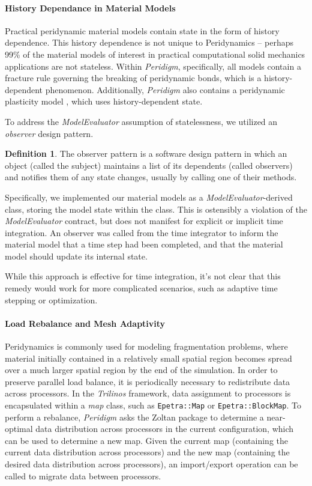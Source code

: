 \documentclass[10pt]{article}
\theoremstyle{plain}
\theoremstyle{definition}
\newtheorem{defn}{Definition}[section]
\theoremstyle{remark}
\numberwithin{equation}{section}
\begin{document}
\paragraph{History Dependance in Material Models}

Practical peridynamic material models contain state in the form of history dependence. This history dependence is not unique to Peridynamics -- perhaps 99\% of the material models of interest in practical computational solid mechanics applications are not stateless. Within \emph{Peridigm}, specifically, all models contain a fracture rule governing the breaking of peridynamic bonds, which is a history-dependent phenomenon. Additionally, \emph{Peridigm} also contains a peridynamic plasticity model \cite{Mitchell:2011:Plasticity}, which uses history-dependent state.

To address the \emph{ModelEvaluator} assumption of statelessness, we utilized an \emph{observer} design pattern.
\begin{defn}
The observer pattern is a software design pattern in which an object (called the subject) maintains a list of its dependents (called observers) and notifies them of any state changes, usually by calling one of their methods.
\end{defn}
Specifically, we implemented our material models as a \emph{ModelEvaluator}-derived class, storing the model state within the class. This is ostensibly a violation of the \emph{ModelEvaluator} contract, but does not manifest for explicit or implicit time integration. An observer was called from the time integrator to inform the material model that a time step had been completed, and that the material model should update its internal state.

While this approach is effective for time integration, it's not clear that this remedy would work for more complicated scenarios, such as adaptive time stepping or optimization.

\paragraph{Load Rebalance and Mesh Adaptivity}

Peridynamics is commonly used for modeling fragmentation problems, where material initially contained in a relatively small spatial region becomes spread over a much larger spatial region by the end of the simulation. In order to preserve parallel load balance, it is periodically necessary to redistribute data across processors. In the \emph{Trilinos} framework, data assignment to processors is encapsulated within a \emph{map} class, such as \verb"Epetra::Map" or \verb"Epetra::BlockMap". To perform a rebalance, \emph{Peridigm} asks the Zoltan package to determine a near-optimal data distribution across processors in the current configuration, which can be used to determine a new map. Given the current map (containing the current data distribution across processors) and the new map (containing the desired data distribution across processors), an import/export operation can be called to migrate data between processors.
\end{document}
